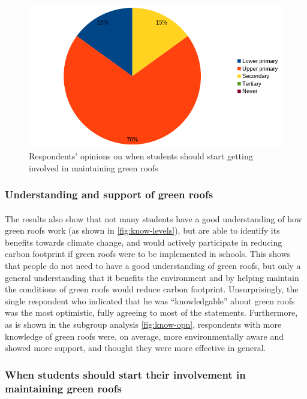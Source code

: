 \documentclass[a4paper]{article}
\begin{document}
\begin{multicols}{2}
  \begin{figure}[H]
    \Centering
    \includegraphics[width=\linewidth]{level.png}
    \caption{
      Respondents' opinions on when students should start getting involved
      in maintaining green roofs
    }
    \label{fig:levels}
  \end{figure}

  \subsubsection{Understanding and support of green roofs}
  \paragraph{} The results also show that not many students
  have a good understanding of how green roofs work (as shown in
  \cref{fig:know-levels}), but are able to identify its benefits towards
  climate change, and would actively participate in reducing carbon
  footprint if green roofs were to be implemented in schools. This shows
  that people do not need to have a good understanding of green roofs,
  but only a general understanding that it benefits the environment and
  by helping maintain the conditions of green roofs would reduce carbon
  footprint. Unsurprisingly, the single respondent who indicated that he
  was ``knowledgable'' about green roofs was the most optimistic, fully
  agreeing to most of the statements. Furthermore, as is shown in the
  subgroup analysis \cref{fig:know-opn}, respondents with more knowledge
  of green roofs were, on average, more environmentally aware and showed
  more support, and thought they were more effective in general.

  \subsubsection{
    When students should start their involvement in maintaining green
    roofs
  }


\end{multicols}
\end{document}
